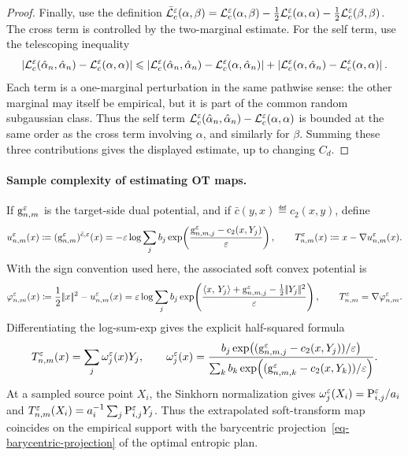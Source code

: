 \begin{proof}
Finally, use the definition
$\bar\MK_\c^\epsilon(\alpha,\beta) = \MK_\c^\epsilon(\alpha,\beta) -\frac12\MK_\c^\epsilon(\alpha,\alpha) -\frac12\MK_\c^\epsilon(\beta,\beta)$.
The cross term is controlled by the two-marginal estimate. For the self term, use the telescoping inequality
\[
\abs{\MK_\c^\epsilon(\hat\alpha_n,\hat\alpha_n)-\MK_\c^\epsilon(\alpha,\alpha)}
\leq
\abs{\MK_\c^\epsilon(\hat\alpha_n,\hat\alpha_n)-\MK_\c^\epsilon(\alpha,\hat\alpha_n)}
+
\abs{\MK_\c^\epsilon(\alpha,\hat\alpha_n)-\MK_\c^\epsilon(\alpha,\alpha)}.
\]
Each term is a one-marginal perturbation in the same pathwise sense: the other marginal may itself be empirical, but it is part of the common random subgaussian class. Thus the self term
\(\MK_\c^\epsilon(\hat\alpha_n,\hat\alpha_n)-\MK_\c^\epsilon(\alpha,\alpha)\)
is bounded at the same order as the cross term involving \(\alpha\), and similarly for \(\beta\). Summing these three contributions gives the displayed estimate, up to changing \(C_d\).
\end{proof}
\paragraph{Sample complexity of estimating OT maps.}
If \(\gD_{n,m}^\epsilon\) is the target-side dual potential, and if \(\bar c(y,x)\eqdef c_2(x,y)\), define
\[
u_{n,m}^\epsilon(x)
\eqdef
(\gD_{n,m}^\epsilon)^{\bar c,\epsilon}(x)
=
-\epsilon\log\sum_j b_j
\exp\!\left(\frac{\gD_{n,m,j}^\epsilon-c_2(x,Y_j)}{\epsilon}\right),
\qquad
T_{n,m}^\epsilon(x)\eqdef x-\nabla u_{n,m}^\epsilon(x).
\]
With the sign convention used here, the associated soft convex potential is
\[
\varphi_{n,m}^\epsilon(x)
\eqdef
\frac12\norm{x}^2-u_{n,m}^\epsilon(x)
=
\epsilon\log\sum_j b_j
\exp\!\left(
\frac{\dotp{x}{Y_j}+\gD_{n,m,j}^\epsilon-\frac12\norm{Y_j}^2}{\epsilon}
\right),
\qquad
T_{n,m}^\epsilon=\nabla\varphi_{n,m}^\epsilon.
\]
Differentiating the log-sum-exp gives the explicit half-squared formula
\begin{equation}\label{eq-empirical-entropic-map-barycentric}
T_{n,m}^\epsilon(x)
=
\sum_j \omega_j^\epsilon(x)Y_j,
\qquad
\omega_j^\epsilon(x)
=
\frac{
b_j\exp\!\left((\gD_{n,m,j}^\epsilon-c_2(x,Y_j))/\epsilon\right)
}{
\sum_k b_k\exp\!\left((\gD_{n,m,k}^\epsilon-c_2(x,Y_k))/\epsilon\right)
}.
\end{equation}
At a sampled source point \(X_i\), the Sinkhorn normalization gives \(\omega_j^\epsilon(X_i)=\P_{i,j}^\epsilon/a_i\) and \(T_{n,m}^\epsilon(X_i)=a_i^{-1}\sum_j \P_{i,j}^\epsilon Y_j\). Thus the extrapolated soft-transform map coincides on the empirical support with the barycentric projection~\eqref{eq-barycentric-projection} of the optimal entropic plan.

